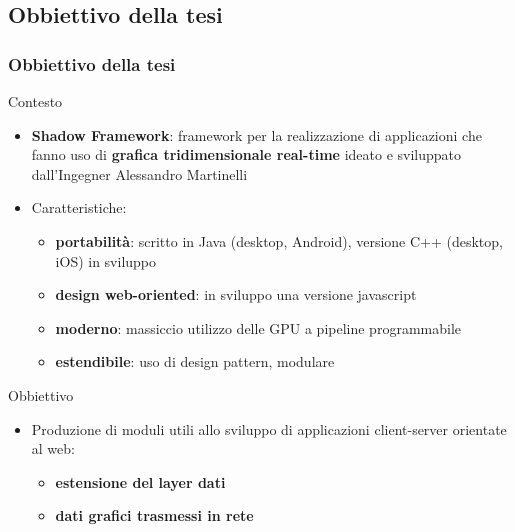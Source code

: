 \documentclass[ignorenonframetext,8pt]{beamer}
\begin{document}
	\subsection{Obbiettivo della tesi}
	\begin{frame}
		\frametitle{Obbiettivo della tesi}
		\begin{block}{Contesto}
			\begin{itemize}
				\item \textbf{Shadow Framework}: framework per la realizzazione di applicazioni che fanno uso di \textbf{grafica tridimensionale real-time} ideato e sviluppato dall'Ingegner Alessandro Martinelli
				\item Caratteristiche:
				\begin{itemize}
					\item \textbf{portabilit\`a}: scritto in Java (desktop, Android), versione C++ (desktop, iOS) in sviluppo %
					\item \textbf{design web-oriented}: in sviluppo una versione javascript %
					\item \textbf{moderno}: massiccio utilizzo delle GPU a pipeline programmabile %
					\item \textbf{estendibile}: uso di design pattern, modulare
				\end{itemize}
			\end{itemize}
		\end{block}

		\begin{block}{Obbiettivo}
			\begin{itemize}
				\item Produzione di moduli utili allo sviluppo di applicazioni client-server orientate al web:
				\begin{itemize}
					\item \textbf{estensione del layer dati}
					\item \textbf{dati grafici trasmessi in rete}
				\end{itemize}
			\end{itemize}
		\end{block}
	\end{frame}
\end{document}
